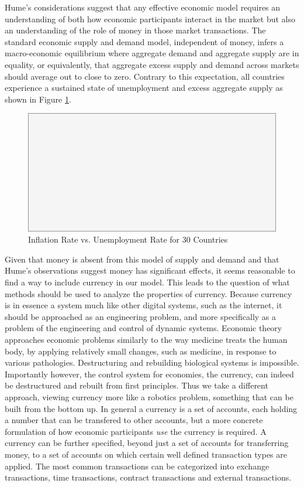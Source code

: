 Hume's considerations suggest that any effective economic model requires an understanding of both
how economic participants interact in the market but also an understanding of the role of money in
those market transactions. The standard economic supply and demand model, independent of money, infers
a macro-economic equilibrium where aggregate demand and aggregate supply are in equality, or
equivalently, that aggregate excess supply and demand across markets should average out to close to
zero. Contrary to this expectation, all countries experience a sustained state of unemployment and
excess aggregate supply as shown in Figure \ref{fig:ui_all_data}.

\begin{figure}[H]
\centering
\includegraphics[scale=0.48]{blank}
\caption{Inflation Rate vs. Unemployment Rate for 30 Countries}
\label{fig:ui_all_data}
\end{figure}

Given that money is absent from this model of supply and demand and that Hume's observations suggest
money has significant effects, it seems reasonable to find a way to include currency in our model.
This leads to the question of what methods should be used to analyze the properties of currency.
Because currency is in essence a system much like other digital systems, such as the internet, it
should be approached as an engineering problem, and more specifically as a problem of the
engineering and control of dynamic systems. Economic theory approaches economic problems similarly
to the way medicine treats the human body, by applying relatively small changes, such as medicine,
in response to various pathologies. Destructuring and rebuilding biological systems is impossible.
Importantly however, the control system for economies, the currency, can indeed be destructured and
rebuilt from first principles. Thus we take a different approach, viewing currency more like a
robotics problem, something that can be built from the bottom up. In general a currency is a set of
accounts, each holding a number that can be transfered to other accounts, but a more concrete
formulation of how economic participants \textit{use} the currency is required. A currency can be
further specified, beyond just a set of accounts for transferring money, to a set of accounts on
which certain well defined transaction types are applied. The most common transactions can be
categorized into exchange transactions, time transactions, contract transactions and external
transactions.

